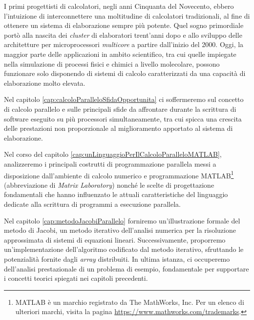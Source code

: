 I primi progettisti di calcolatori, negli anni Cinquanta del Novecento, ebbero l'intuizione di interconnettere
una moltitudine di calcolatori tradizionali, al fine di ottenere un sistema di elaborazione sempre più potente. Quel sogno primordiale port\`o alla nascita dei \textit{cluster} di elaboratori trent'anni dopo e allo sviluppo delle architetture per microprocessori
\textit{multicore} a partire dall'inizio del 2000.\newline
Oggi, la maggior parte delle applicazioni in ambito scientifico, tra cui quelle impiegate nella simulazione di processi fisici e chimici a livello molecolare, possono funzionare solo disponendo di sistemi di calcolo caratterizzati da una capacit\`a di elaborazione molto elevata.

Nel capitolo \ref{cap:calcoloParalleloSfidaOpportunita} ci soffermeremo sul concetto di calcolo parallelo e sulle principali sfide da affrontare
durante la scrittura di software eseguito su pi\`u processori simultaneamente, tra cui spicca una crescita delle prestazioni non proporzionale
al miglioramento apportato al sistema di elaborazione.

Nel corso del capitolo \ref{cap:unLinguaggioPerIlCalcoloParalleloMATLAB}, analizzeremo i principali costrutti di programmazione parallela messi a disposizione dall’ambiente di calcolo numerico
e programmazione MATLAB\textsuperscript{\textregistered}\footnote{MATLAB \`e un marchio registrato da The MathWorks, Inc. Per un elenco di ulteriori marchi, visita la pagina \url{https://www.mathworks.com/trademarks}.} (abbreviazione di \textit{Matrix Laboratory}) nonch\'e le scelte di progettazione fondamentali che hanno influenzato
le attuali caratteristiche del linguaggio dedicate alla scrittura di programmi a esecuzione parallela.

Nel capitolo \ref{cap:metodoJacobiParallelo} forniremo un'illustrazione formale del metodo di Jacobi, un metodo iterativo dell’analisi numerica per la risoluzione
approssimata di sistemi di equazioni lineari. Successivamente, proporremo un’implementazione dell'algoritmo codificato dal metodo iterativo, sfruttando le potenzialità fornite
dagli \textit{array} distribuiti. In ultima istanza, ci occuperemo dell’analisi prestazionale di un problema di esempio, fondamentale per supportare i concetti teorici spiegati nei capitoli precedenti.
